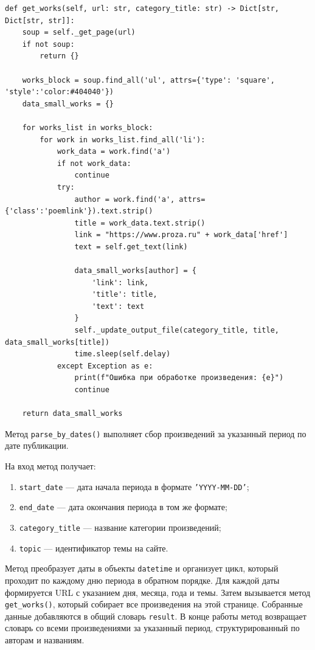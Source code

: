 \documentclass[coursework]{SCWorks}
\begin{document}
    \begin{verbatim}
def get_works(self, url: str, category_title: str) -> Dict[str, Dict[str, str]]:
    soup = self._get_page(url)
    if not soup:
        return {}

    works_block = soup.find_all('ul', attrs={'type': 'square', 'style':'color:#404040'})
    data_small_works = {}

    for works_list in works_block:
        for work in works_list.find_all('li'):
            work_data = work.find('a')
            if not work_data:
                continue
            try:
                author = work.find('a', attrs={'class':'poemlink'}).text.strip()
                title = work_data.text.strip()
                link = "https://www.proza.ru" + work_data['href']
                text = self.get_text(link)

                data_small_works[author] = {
                    'link': link,
                    'title': title,
                    'text': text
                }
                self._update_output_file(category_title, title, data_small_works[title])
                time.sleep(self.delay)
            except Exception as e:
                print(f"Ошибка при обработке произведения: {e}")
                continue

    return data_small_works
    \end{verbatim}

    Метод \texttt{parse\_by\_dates()} выполняет сбор произведений за указанный период по дате публикации.

    На вход метод получает:
    \begin{enumerate}
        \item \texttt{start\_date} — дата начала периода в формате \texttt{'YYYY-MM-DD'};
        \item \texttt{end\_date} — дата окончания периода в том же формате;
        \item \texttt{category\_title} — название категории произведений;
        \item \texttt{topic} — идентификатор темы на сайте.
    \end{enumerate}

    Метод преобразует даты в объекты \texttt{datetime} и организует цикл, который проходит по каждому дню периода в обратном порядке.
    Для каждой даты формируется URL с указанием дня, месяца, года и темы.
    Затем вызывается метод \texttt{get\_works()}, который собирает все произведения на этой странице.
    Собранные данные добавляются в общий словарь \texttt{result}.
    В конце работы метод возвращает словарь со всеми произведениями за указанный период, структурированный по авторам и названиям.
\end{document}
